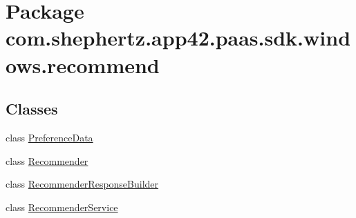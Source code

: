 \hypertarget{namespacecom_1_1shephertz_1_1app42_1_1paas_1_1sdk_1_1windows_1_1recommend}{\section{Package com.\+shephertz.\+app42.\+paas.\+sdk.\+windows.\+recommend}
\label{namespacecom_1_1shephertz_1_1app42_1_1paas_1_1sdk_1_1windows_1_1recommend}
}
\subsection*{Classes}
\begin{DoxyCompactItemize}
\item 
class \hyperlink{classcom_1_1shephertz_1_1app42_1_1paas_1_1sdk_1_1windows_1_1recommend_1_1_preference_data}{Preference\+Data}
\item 
class \hyperlink{classcom_1_1shephertz_1_1app42_1_1paas_1_1sdk_1_1windows_1_1recommend_1_1_recommender}{Recommender}
\item 
class \hyperlink{classcom_1_1shephertz_1_1app42_1_1paas_1_1sdk_1_1windows_1_1recommend_1_1_recommender_response_builder}{Recommender\+Response\+Builder}
\item 
class \hyperlink{classcom_1_1shephertz_1_1app42_1_1paas_1_1sdk_1_1windows_1_1recommend_1_1_recommender_service}{Recommender\+Service}

\end{DoxyCompactItemize}
